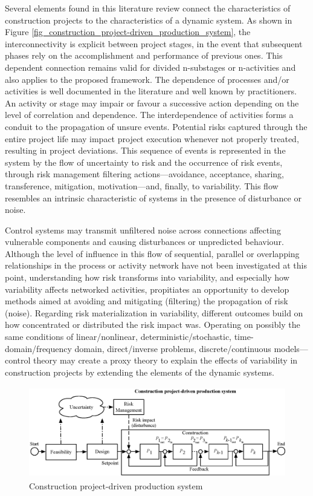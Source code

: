 \documentclass{article}
\begin{document}
Several elements found in this literature review connect the characteristics of construction projects to the characteristics of a dynamic system.
As shown in Figure \ref{fig_construction_project-driven_production_system}, the interconnectivity is explicit between project stages, in the event that subsequent phases rely on the accomplishment and performance of previous ones.
This dependent connection remains valid for divided n-substages or n-activities and also applies to the proposed framework.
The dependence of processes and/or activities is well documented in the literature and well known by practitioners.
An activity or stage may impair or favour a successive action depending on the level of correlation and dependence.
The interdependence of activities forms a conduit to the propagation of unsure events. Potential risks captured through the entire project life may impact project execution whenever not properly treated, resulting in project deviations.
This sequence of events is represented in the system by the flow of uncertainty to risk and the occurrence of risk events, through risk management filtering actions—avoidance, acceptance, sharing, transference, mitigation, motivation—and, finally, to variability.
This flow resembles an intrinsic characteristic of systems in the presence of disturbance or noise.

Control systems may transmit unfiltered noise across connections affecting vulnerable components and causing disturbances or unpredicted behaviour.
Although the level of influence in this flow of sequential, parallel or overlapping relationships in the process or activity network have not been investigated at this point, understanding how risk transforms into variability, and especially how variability affects networked activities, propitiates an opportunity to develop methods aimed at avoiding and mitigating (filtering) the propagation of risk (noise). Regarding risk materialization in variability, different outcomes build on how concentrated or distributed the risk impact was.
 Operating on possibly the same conditions of linear/nonlinear, deterministic/stochastic, time-domain/frequency domain, direct/inverse problems, discrete/continuous models---control theory may create a proxy theory to explain the effects of variability in construction projects by extending the elements of the dynamic systems.


\begin{figure}[htbp]
\centering
\includegraphics[height=150]{./Figures/Construction_project_driven_production_system.eps}
\caption{\label{fig:org70f4a7e}Construction project-driven production system}
\end{figure}
\end{document}
